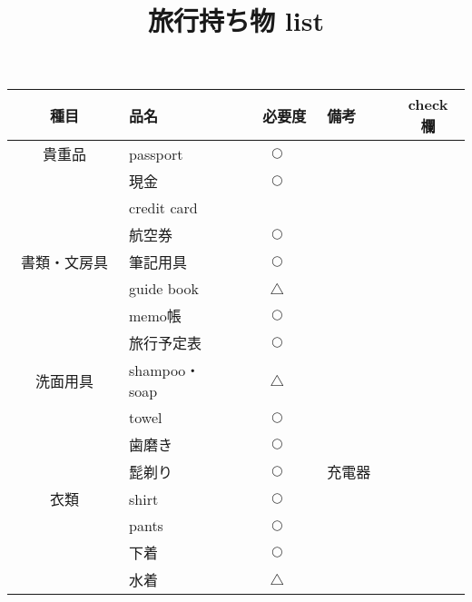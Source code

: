 \documentclass[12pt,a4paper]{article}
\title{旅行持ち物 list}
\newcommand{\maru}{$\bigcirc$}
\newcommand{\sankaku}{$\bigtriangleup$}
\begin{document}
\maketitle

\begin{center}
\begin{table}[htb]
	\begin{tabular}{| c | l | c | l | c |} \hline
		種目 & 品名 &　必要度　& 備考 & check 欄\\ \hline \hline
		貴重品　		& passport &  \maru &  & \\ \cline{2-5}
		 			& 現金 & \maru & & \\ \cline{2-5}
					& credit card &  & & \\ \cline{2-5}
					& 航空券 & \maru & & \\ \hline
		書類・文房具	& 筆記用具 & \maru & & \\ \cline{2-5}
					& guide book & \sankaku & & \\ \cline{2-5}
					& memo帳 & \maru & & \\ \cline{2-5}
					& 旅行予定表& \maru & & \\ \hline
		洗面用具　　　& shampoo・soap &\sankaku & & \\ \cline{2-5}
					& towel & \maru & & \\ \cline{2-5}
					& 歯磨き & \maru & & \\ \cline{2-5}
					& 髭剃り & \maru & 充電器　& \\ \hline
		 衣類　　		& shirt &\maru & & \\ \cline{2-5}
		 			& pants &\maru & & \\ \cline{2-5}
					& 下着 &\maru & & \\ \cline{2-5}
		 			& 水着 &\sankaku & & \\ \cline{2-5}
					
	\end{tabular}
\end{table}
\end{center}
\end{document}
